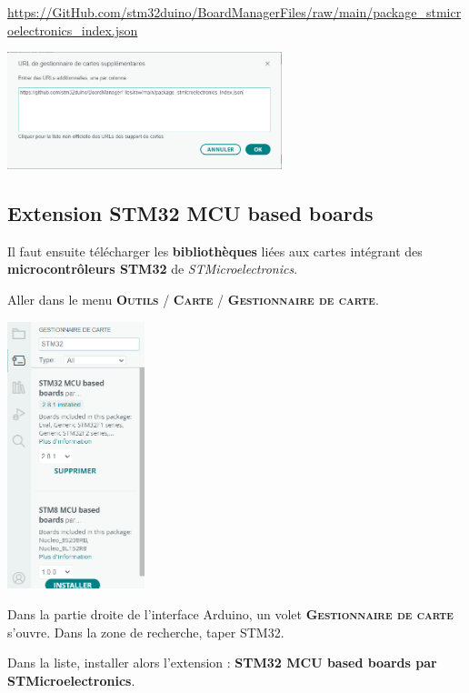 \documentclass[a4paper,11pt,titlepage]{article} %
\begin{document}
\href{https://GitHub.com/stm32duino/BoardManagerFiles/raw/main/package_stmicroelectronics_index.json}{https://GitHub.com/stm32duino/BoardManagerFiles/raw/main/package\_stmicroelectronics\_index.json}

\begin{center}
	\includegraphics[width=0.6\textwidth]{images/arduino_preferences_url.png}
\end{center}

\subsection{Extension STM32 MCU based boards}

Il faut ensuite télécharger les \textbf{bibliothèques} liées aux cartes intégrant des \textbf{microcontrôleurs STM32} de \textit{STMicroelectronics}.

Aller dans le menu \textsc{\textbf{Outils} / \textbf{Carte} / \textbf{Gestionnaire de carte}}. 

\begin{center}
	\includegraphics[width=0.3\textwidth]{images/arduino_gestion_cartes.png}
\end{center}

Dans la partie droite de l'interface Arduino, un volet \textsc{\textbf{Gestionnaire de carte}} s'ouvre. Dans la zone de recherche, taper STM32.

Dans la liste, installer alors l'extension : \textbf{STM32 MCU based boards par STMicroelectronics}.
\end{document}
